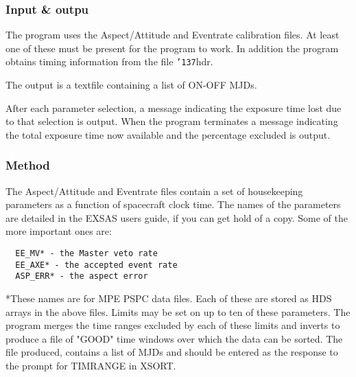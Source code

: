 \documentclass{book}
\renewcommand{\_}{{\tt\char'137}}     %
\begin{document}
\subsubsection{Input \& outpu}
The program uses the Aspect/Attitude and Eventrate calibration files.
At least one of these must be present for the program to work.
In addition the program obtains timing information from the file
\_hdr.
 
The output is a textfile containing a list of ON-OFF MJDs.
 
After each parameter selection, a message indicating the exposure
time lost due to that selection is output. When the program terminates
a message indicating the total exposure time now available and the
percentage excluded is output.
 
\subsubsection{Method}
The Aspect/Attitude and Eventrate files contain a set of
housekeeping parameters as a function of spacecraft clock time.
The names of the parameters are detailed in the EXSAS users guide,
if you can get hold of a copy. Some of the more important
ones are:
\begin{verbatim}
  EE_MV* - the Master veto rate
  EE_AXE* - the accepted event rate
  ASP_ERR* - the aspect error
\end{verbatim}
*These names are for MPE PSPC data files.
Each of these are stored as HDS arrays in the above files.
Limits may be set on up to ten of these parameters. The program
merges the time ranges excluded by each of these limits and
inverts to produce a file of "GOOD" time windows over which the
data can be sorted. The file produced, contains a list of MJDs and
should be entered as the response to the prompt for TIMRANGE in
XSORT.
 
\end{document}
